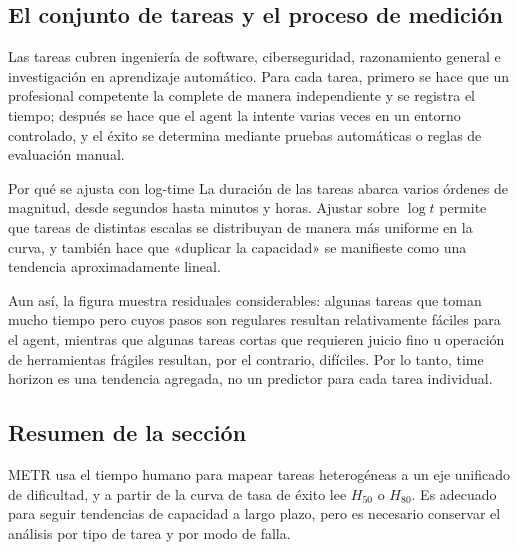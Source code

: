 \subsection{El conjunto de tareas y el proceso de medición}



Las tareas cubren ingeniería de software, ciberseguridad, razonamiento general e investigación en aprendizaje automático. Para cada tarea, primero se hace que un profesional competente la complete de manera independiente y se registra el tiempo; después se hace que el agent la intente varias veces en un entorno controlado, y el éxito se determina mediante pruebas automáticas o reglas de evaluación manual.

\begin{knowledgebox}{Por qué se ajusta con log-time}
La duración de las tareas abarca varios órdenes de magnitud, desde segundos hasta minutos y horas. Ajustar sobre $\log t$ permite que tareas de distintas escalas se distribuyan de manera más uniforme en la curva, y también hace que «duplicar la capacidad» se manifieste como una tendencia aproximadamente lineal.
\end{knowledgebox}


Aun así, la figura muestra residuales considerables: algunas tareas que toman mucho tiempo pero cuyos pasos son regulares resultan relativamente fáciles para el agent, mientras que algunas tareas cortas que requieren juicio fino u operación de herramientas frágiles resultan, por el contrario, difíciles. Por lo tanto, time horizon es una tendencia agregada, no un predictor para cada tarea individual.

\subsection{Resumen de la sección}

METR usa el tiempo humano para mapear tareas heterogéneas a un eje unificado de dificultad, y a partir de la curva de tasa de éxito lee $H_{50}$ o $H_{80}$. Es adecuado para seguir tendencias de capacidad a largo plazo, pero es necesario conservar el análisis por tipo de tarea y por modo de falla.
